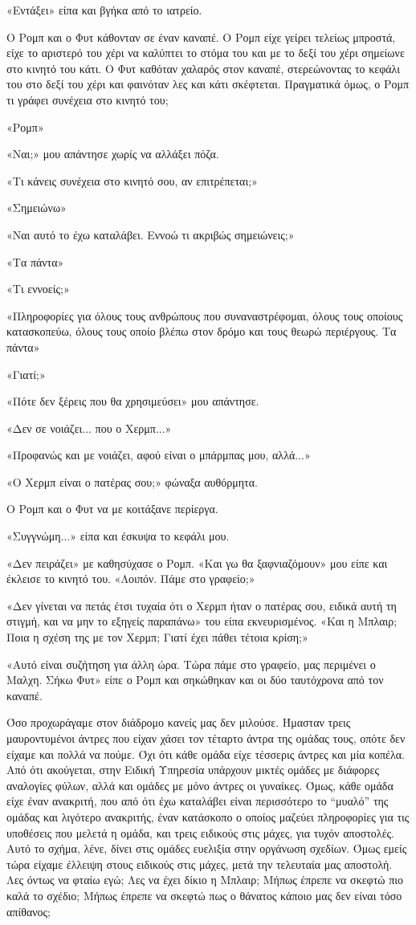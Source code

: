 \documentclass[12pt,twoside, openany]{book}
\begin{document}
«Εντάξει» είπα και βγήκα από το ιατρείο. 

Ο Ρομπ και ο Φυτ κάθονταν σε έναν καναπέ. Ο Ρομπ είχε γείρει τελείως μπροστά, είχε το αριστερό του χέρι να καλύπτει το στόμα του και με το δεξί του χέρι σημείωνε στο κινητό του κάτι. Ο Φυτ καθόταν χαλαρός στον καναπέ, στερεώνοντας το κεφάλι του στο δεξί του χέρι και φαινόταν λες και κάτι σκέφτεται. Πραγματικά όμως, ο Ρομπ τι γράφει συνέχεια στο κινητό του;

«Ρομπ»

«Ναι;» μου απάντησε χωρίς να αλλάξει πόζα.

«Τι κάνεις συνέχεια στο κινητό σου, αν επιτρέπεται;»

«Σημειώνω»

«Ναι αυτό το έχω καταλάβει. Εννοώ τι ακριβώς σημειώνεις;»

«Τα πάντα»

«Τι εννοείς;»

«Πληροφορίες για όλους τους ανθρώπους που συναναστρέφομαι, όλους τους οποίους κατασκοπεύω, όλους τους οποίο βλέπω στον δρόμο και τους θεωρώ περιέργους. Τα πάντα»

«Γιατί;»

«Πότε δεν ξέρεις που θα χρησιμεύσει» μου απάντησε.

«Δεν σε νοιάζει... που ο Χερμπ...»

«Προφανώς και με νοιάζει, αφού είναι ο μπάρμπας μου, αλλά...»

«Ο Χερμπ είναι ο πατέρας σου;» φώναξα αυθόρμητα. 

Ο Ρομπ και ο Φυτ να με κοιτάξανε περίεργα.

«Συγγνώμη...» είπα και έσκυψα το κεφάλι μου.

«Δεν πειράζει» με καθησύχασε ο Ρομπ. «Και γω θα ξαφνιαζόμουν» μου είπε και έκλεισε το κινητό του. «Λοιπόν. Πάμε στο γραφείο;»

«Δεν γίνεται να πετάς έτσι τυχαία ότι ο Χερμπ ήταν ο πατέρας σου, ειδικά αυτή τη στιγμή, και να μην το εξηγείς παραπάνω» του είπα εκνευρισμένος. «Και η Μπλαιρ; Ποια η σχέση της με τον Χερμπ; Γιατί έχει πάθει τέτοια κρίση;»

«Αυτό είναι συζήτηση για άλλη ώρα. Τώρα πάμε στο γραφείο, μας περιμένει ο Μαλχη. Σήκω Φυτ» είπε ο Ρομπ και σηκώθηκαν και οι δύο ταυτόχρονα από τον καναπέ.

Όσο προχωράγαμε στον διάδρομο κανείς μας δεν μιλούσε. Ήμασταν τρεις μαυροντυμένοι άντρες που είχαν χάσει τον τέταρτο άντρα της ομάδας τους, οπότε δεν είχαμε και πολλά να πούμε. Όχι ότι κάθε ομάδα είχε τέσσερις άντρες και μία κοπέλα. Από ότι ακούγεται, στην Ειδική Υπηρεσία υπάρχουν μικτές ομάδες με διάφορες αναλογίες φύλων, αλλά και ομάδες με μόνο άντρες οι γυναίκες. Όμως, κάθε ομάδα είχε έναν ανακριτή, που από ότι έχω καταλάβει είναι περισσότερο το “μυαλό” της ομάδας και λιγότερο ανακριτής, έναν κατάσκοπο ο οποίος μαζεύει πληροφορίες για τις υποθέσεις που μελετά η ομάδα, και τρεις ειδικούς στις μάχες, για τυχόν αποστολές. Αυτό το σχήμα, λένε, δίνει στις ομάδες ευελιξία στην οργάνωση σχεδίων. Όμως εμείς τώρα είχαμε έλλειψη στους ειδικούς στις μάχες, μετά την τελευταία μας αποστολή. Λες όντως να φταίω εγώ; Λες να έχει δίκιο η Μπλαιρ; Μήπως έπρεπε να σκεφτώ πιο καλά το σχέδιο; Μήπως έπρεπε να σκεφτώ πως ο θάνατος κάποιο μας δεν είναι τόσο απίθανος; 
\end{document}
